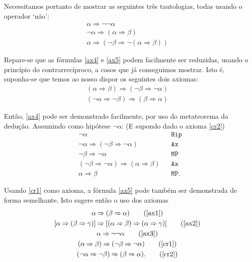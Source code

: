 \documentclass{report}
\theoremstyle{definition}
\theoremstyle{remark}
\newcommand{\imply}{\mathbin{\Rightarrow}}
\begin{document}
	Necessitamos portanto de mostrar as seguintes três tautologias, todas usando o operador `não':
	\begin{gather}
	\alpha \imply \neg \neg \alpha\label{ax3}\\
	\neg \alpha \imply (\alpha \imply \beta)\label{ax4}\\
	\alpha \imply (\neg \beta \imply \neg (\alpha \imply \beta))\label{ax5}
	\end{gather}
	
	Repare-se que as fórmulas \eqref{ax4} e \eqref{ax5} podem facilmente ser reduzidas, usando o princípio do contrarrecíproco, a casos que já conseguimos mostrar. Isto é, suponha-se que temos ao nosso dispor os seguintes dois axiomas:
	\begin{gather}
	(\alpha \imply \beta) \imply (\neg \beta \imply \neg \alpha)\label{cr1}\\
	(\neg \alpha \imply \neg \beta) \imply (\beta \imply \alpha)\label{cr2}
	\end{gather}
	
	Então, \eqref{ax4} pode ser demonstrado facilmente, por uso do metateorema da dedução. Assumindo como hipótese $\neg \alpha$: (E supondo dado o axioma \eqref{cr2})
	\begin{align*}
	&\neg \alpha&&\texttt{Hip}\\
	&\neg \alpha \imply (\neg \beta \imply \neg \alpha)&&\texttt{Ax}\\
	&\neg \beta \imply \neg \alpha&&\texttt{MP}\\
	&(\neg \beta \imply \neg \alpha) \imply (\alpha \imply \beta)&&\texttt{Ax}\\
	&\alpha \imply \beta&&\texttt{MP}.
	\end{align*}
	
	Usando \eqref{cr1} como axioma, a fórmula \eqref{ax5} pode também ser demonstrada de forma semelhante. Isto sugere então o uso dos axiomas
	\begin{gather}
	\alpha \imply (\beta \imply \alpha) \tag{\ref{ax1}}\\
	[\alpha \imply (\beta \imply \gamma)] \imply [(\alpha \imply \beta) \imply (\alpha \imply \gamma)]\tag{\ref{ax2}}\\
	\alpha \imply \neg \neg \alpha \tag{\ref{ax3}}\\
	(\alpha \imply \beta) \imply (\neg \beta \imply \neg \alpha)\tag{\ref{cr1}}\\
	(\neg \alpha \imply \neg \beta) \imply (\beta \imply \alpha).\tag{\ref{cr2}}
	\end{gather}
	
\end{document}
